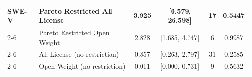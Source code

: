 \begin{table}[h!]
\begin{tabular}{|l|l|c|c|c|c|}
SWE\mbox{-}V & Pareto Restricted All License & 3.925 & [0.579, 26.598] & 17 & 0.5447 \\ \cline{2-6}
\rowcolor{restrgray} \cellcolor{white} & Pareto Restricted Open Weight & 2.828 & [1.685, 4.747] & 6 & 0.9987 \\ \cline{2-6}
\cellcolor{white} & All License (no restriction) & 0.857 & [0.263, 2.797] & 31 & 0.2585 \\ \cline{2-6}
\rowcolor{restrgray} \cellcolor{white} & Open Weight (no restriction) & 0.011 & [0.000, 0.731] & 9 & 0.5632 \\
\hline

\end{tabular}
\end{table}

\FloatBarrier

\renewcommand{\arraystretch}{1.2}

